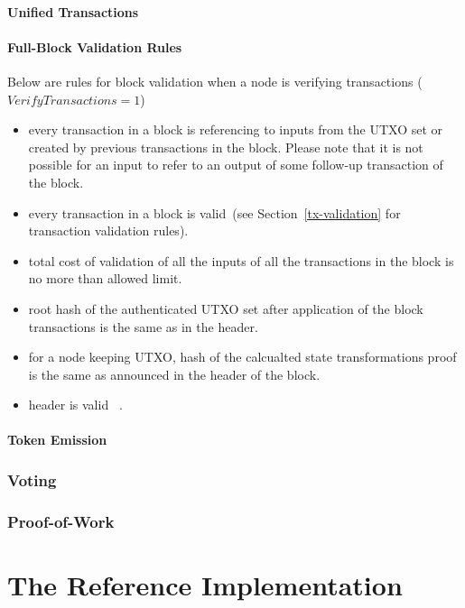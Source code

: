 \documentclass[]{article}   %
\newcommand{\authnote}[2]{\marginpar{\parbox{\marginparwidth}{\tiny %
  \textsf{#1 {\textcolor{blue}{notes: #2}}}}}%
  \textcolor{blue}{\textbf{\dag}}}
\newcommand{\authnote}[2]{
  \textsf{#1 \textcolor{blue}{: #2}}}
\newcommand{\authnote}[2]{}
\newcommand{\knote}[1]{{\authnote{\textcolor{green}{Alex notes}}{#1}}}
\begin{document}
\subsection{Unified Transactions}

\knote{Write about fee as boxes and absence of out-of-thin-air emission in the "coinbase" transaction.}

\subsection{Full-Block Validation Rules}

Below are rules for block validation when a node is verifying transactions ($VerifyTransactions = 1$)

\begin{itemize}
    \item{} every transaction in a block is referencing to inputs from the UTXO set or created by previous transactions
    in the block. Please note that it is not possible for an input to refer to an output of some follow-up transaction
    of the block.
    \item{} every transaction in a block is valid~(see Section~\ref{tx-validation} for transaction validation rules).
    \item{} total cost of validation of all the inputs of all the transactions in the block is no more than
    allowed limit.
    \item{} root hash of the authenticated UTXO set after application of the block transactions is the same as
    in the header.
    \item{} for a node keeping UTXO, hash of the calcualted state transformations proof is the same as announced
    in the header of the block.
    \item{} header is valid~\knote{link to header validation rules}.
\end{itemize}

\knote{mention emission rules. extractEmissionBox is buggy probably.}
\knote{extension validation rules}

\subsection{Token Emission}


\section{Voting}


\section{Proof-of-Work}

\part{The Reference Implementation}
\label{part-impl}





\end{document}
